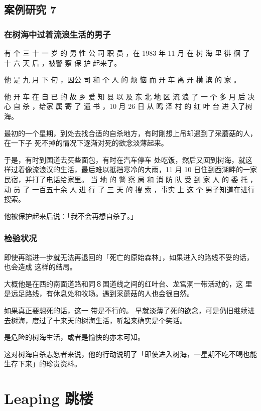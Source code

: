 \documentclass[UTF8]{ctexart}
\begin{document}
\subsection{案例研究 7}
\subsubsection*{在树海中过着流浪生活的男子}

有 个 三 十 一 岁 的 男 性 公 司 职 员 ，在 1983 年 11 月 在 树 海 里 徘 徊 了 十 六 天 后 ，被警 察 保 护 起来了。

他 是 九 月 下 旬 ，因公 司 和 个 人 的 烦 恼 而 开 车 离 开 横 滨 的 家 。

他 开 车 在 自 已 的 故 乡 爱 知 县 以 及 东 北 地 区 流 浪 了 一 个 多 月 后 决 心 自 杀 ，给家 属 寄 了 遗 书 ，10 月 26 日 从 鸣 泽 村 的 红 叶 台 进 入了树海。

最初的一个星期，到处去找合适的自杀地方，有时刚想上吊却遇到了采蘑菇的人，在一下子 死不掉的情况下逐渐对死的欲念淡薄起来。

于是，有时到国道去买些面包，有时在汽车停车 处吃饭，然后又回到树海，就这样过着像流浪汉的生活，最后难以抵挡寒冷的大雨，11 月 10 日住到西湖畔的一家民宿，并打了电话给家里。 当 地 的 警 察 局 和 消 防 队 受 到 家 人 的 委 托 ，动 员 了 一百五十余 人 进 行 了 三 天 的 搜 索 ，事实 上 这 个 男子知道在进行搜索。

他被保护起来后说：「我不会再想自杀了。」

\subsubsection*{检验状况}

即使再踏进一步就无法再退回的「死亡的原始森林」，如果进入的路线不妥的话，也会造成
这样的结局。

大概他是在西的南面道路和同８国道线之间的红叶台、龙宫洞一带活动的，这
里是远足路线，有休息处和牧场。遇到采蘑菇的人也会很自然。

如果真正要想死的话，这一 带是不行的。 早就淡薄了死的欲念，可是仍旧继续进去树海，度过了十来天的树海生活，听起来确实是个笑话。

是危险的树海生活，或者是愉快的亦未可知。

这对树海自杀志愿者来说，他的行动说明了「即使进入树海，一星期不吃不喝也能生存下来」的珍贵资料。


\section{Leaping 跳楼}
\end{document}
